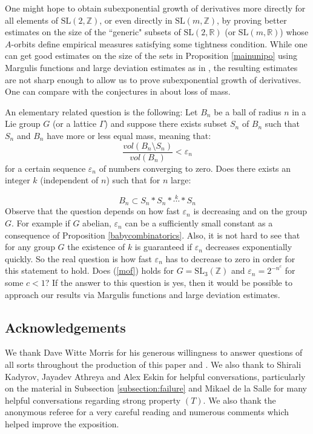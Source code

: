 \documentclass[10pt,reqno]{amsart}
\theoremstyle{Theorem}
\theoremstyle{definition}
\theoremstyle{remark}
\renewcommand{\epsilon}{\varepsilon}
\newcommand{\R}{\mathbb {R}}
\newcommand{\Z}{\mathbb {Z}}
\newcommand{\e}{\epsilon}
\newcommand{\Sl}{\mathrm{SL}}
\def\blue{}
\begin{document}
One might hope to obtain subexponential growth of derivatives more directly for all elements of $\Sl(2,\Z)$, or even directly in $\Sl(m,\Z)$, by proving better estimates on the size of the ``generic" subsets of $\Sl(2,\R)$  (or $\Sl(m, \R)$) whose $A$-orbits define empirical measures satisfying some tightness condition. While one can get good estimates on the size of the sets in Proposition \ref{mainunipo} using Margulis functions and large deviation estimates as in  \cite{MR2247652, MR2787598}, the resulting estimates are not sharp enough to allow us to prove subexponential growth of derivatives. One can compare with the conjectures in \cite{KKLM} about loss of mass.

An elementary related question is the following:  Let $B_n$ be a ball of radius $n$ in a Lie group $G$ (or a lattice $\Gamma$) and suppose there exists subset $S_n$ of $B_n$ such that $S_n$ and $B_n$ have more or less equal mass, meaning that: $$\frac{vol(B_n \setminus S_n)}{vol(B_n)} < \e_n $$ for a certain sequence $\e_n$ of numbers converging to zero. Does there exists an integer $k$ (independent of $n$) such that for $n$ large:

\begin{equation}\label{mof}
B_{n} \subset S_n*S_n*\stackrel{k}{\cdots}*S_n
\end{equation}
Observe that the question depends on how fast $\e_n$ is decreasing and on the group $G$. For example if $G$ abelian, $\e_n$ can be a sufficiently small constant as a consequence of Proposition \ref{babycombinatorics}.  Also, it is not hard to see that for any group $G$ the existence of $k$ is guaranteed if $\e_n$ decreases exponentially quickly.  So the real question is how fast $\e_n$ has to decrease to zero in order for this statement to hold.  Does (\ref{mof}) holds for $ G = \Sl_3(\Z)$ and $\e_n = 2^{-n^c}$  for some $c < 1$?  If the answer to this question is yes, then it would be possible to approach our results via Margulis functions and large deviation estimates.


\subsection*{Acknowledgements}  We thank Dave Witte Morris for his generous willingness to answer questions of all sorts throughout the production of this paper and \cite{BFH}.  We also thank to Shirali Kadyrov, Jayadev Athreya and Alex Eskin for helpful conversations, particularly on the material in Subsection \ref{subsection:failure} and Mikael de la Salle for many helpful conversations regarding strong property $(T)$.  {\blue We also thank the anonymous referee for a very careful reading and numerous comments which helped improve the exposition.}
\end{document}
